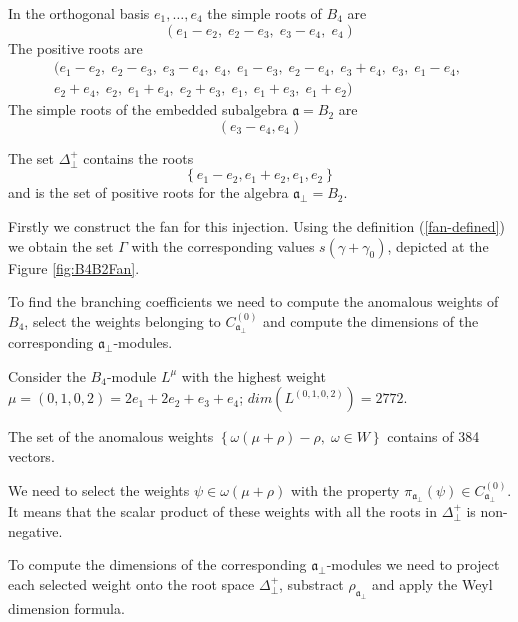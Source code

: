 \documentclass[a4paper,12pt]{article}
\theoremstyle{definition} \newtheorem{Def}{Definition}
\begin{document}
In the orthogonal basis $e_1,\dots,e_4$ the simple roots of $B_4$ are
\begin{equation}
  \label{eq:8}
  (e_1 - e_2,\; e_2 - e_3,\; e_3 - e_4,\; e_4)
\end{equation}
The positive roots are
\begin{multline}
  \label{eq:19}
  (e_1 - e_2,\; e_2 - e_3,\; e_3 - e_4,\; e_4,\; e_1 - e_3,\; e_2 - e_4,\; e_3 + e_4,\; e_3,\; e_1 - e_4,\;\\
    e_2 + e_4,\; e_2,\; e_1 + e_4,\; e_2 + e_3,\; e_1,\; e_1 + e_3,\; e_1 + e_2)
\end{multline}
The simple roots of the embedded subalgebra $\mathfrak{a}=B_2$ are
\begin{equation}
  \label{eq:26}
  (e_3-e_4,e_4)
\end{equation}

The set $\Delta^{+}_{\bot}$ contains the roots
\begin{equation}
  \label{eq:27}
  \left\{e_1-e_2,e_1+e_2,e_1,e_2\right\}
\end{equation}
and is the set of positive roots for the algebra $\mathfrak{a}_{\bot}=B_2$.

Firstly we construct the fan for this injection.
Using the definition (\ref{fan-defined}) we obtain the set $\Gamma$ with the corresponding values $s(\gamma+\gamma_0)$, depicted at the Figure \ref{fig:B4B2Fan}.

To find the branching coefficients we need to compute the anomalous weights of $B_4$, select the weights belonging to $C^{\left( 0 \right)}_{\mathfrak{a}_{\bot}}$ and compute the dimensions of the corresponding $\mathfrak{a}_{\bot}$-modules.

Consider the $B_4$-module $L^{\mu}$ with the highest weight $\mu=(0,1,0,2)=2
e_1 + 2 e_2 + e_3 + e_4$; $dim(L^{(0,1,0,2)})=2772$.

The set of the anomalous weights $\left\{ \omega(\mu+\rho)-\rho,\; \omega\in W\right\}$
contains of 384 vectors.

We need to select the weights $\psi \in \omega(\mu+\rho)$  with the property $\pi_{\mathfrak{a}_{\bot}} \left(  \psi \right) \in C^{\left( 0 \right)}_{\mathfrak{a}_{\bot}}$.
It means that the scalar product of these weights with all the roots in $\Delta^{+}_{\bot}$ is non-negative.

To compute the dimensions of the corresponding
$\mathfrak{a}_{\bot}$-modules we need to project each selected weight
onto the root space $\Delta^{+}_{\bot}$, substract
$\rho_{\mathfrak{a}_{\bot}}$ and apply the Weyl dimension formula.
\end{document}
